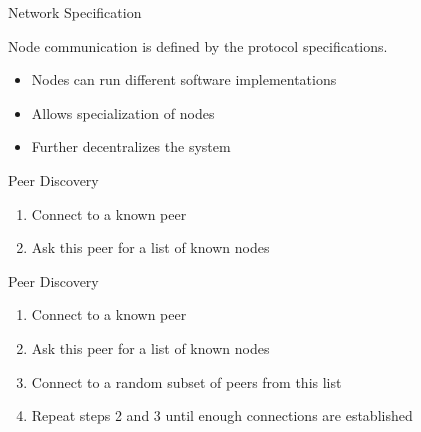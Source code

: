 \documentclass[handout]{beamer}
\begin{document}
\begin{frame}{Network Specification}
	\begin{center}
		\begin{tikzpicture}[scale=0.7, every node/.style={scale=1}]
			
		\end{tikzpicture}
	\end{center}
	\vspace{.5 cm}
	Node communication is defined by the \color{focus}protocol specifications\color{black}.
	\begin{itemize}
		\item<2-> Nodes can run different software implementations
		\item<3-> Allows specialization of nodes
		\item<4-> \color{focus}Further decentralizes \color{black}the system
	\end{itemize}
\end{frame}

\begin{frame}{Peer Discovery}
	\begin{center}
		\begin{tikzpicture}[scale=1, every node/.style={scale=1}]
			
		\end{tikzpicture}
	\end{center}
	\begin{enumerate}
		\item<2-> Connect to a known peer
		\item<3-> Ask this peer for a list of known nodes
	\end{enumerate}
	\vspace{1cm}
\end{frame}

\begin{frame}{Peer Discovery}
	\begin{center}
		\begin{tikzpicture}[scale=1, every node/.style={scale=1}]
			
		\end{tikzpicture}
	\end{center}
	\begin{enumerate}
		\item Connect to a known peer
		\item Ask this peer for a list of known nodes
		\item Connect to a random subset of peers from this list
		\item<2-> Repeat steps 2 and 3 until enough connections are established
	\end{enumerate}
\end{frame}
\end{document}
